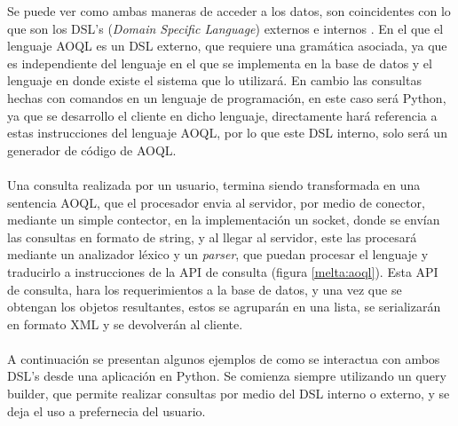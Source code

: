 \documentclass{melta}
\begin{document}
Se puede ver como ambas maneras de acceder a los datos, son coincidentes con lo que son los DSL's (\textit{Domain Specific Language}) externos e internos \cite{dsl:Freeman}\cite{Deursen00domain-specificlanguages:Klint}. En el que el lenguaje AOQL es un DSL externo, que requiere una gramática asociada, ya que es independiente del lenguaje en el que se implementa en la base de datos y el lenguaje en donde existe el sistema que lo utilizará. En cambio las consultas hechas con comandos en un lenguaje de programación, en este caso será Python, ya que se desarrollo el cliente en dicho lenguaje, directamente hará referencia a estas instrucciones del lenguaje AOQL, por lo que este DSL interno, solo será un generador de código de AOQL.
\\\\
Una consulta realizada por un usuario, termina siendo transformada en una sentencia AOQL, que el procesador envia al servidor, por medio de conector, mediante un simple contector, en la implementación un socket, donde se envían las consultas en formato de string, y al llegar al servidor, este las procesará mediante un analizador léxico y un \textit{parser}, que puedan procesar el lenguaje y traducirlo a instrucciones de la API de consulta (figura \ref{melta:aoql}). Esta API de consulta, hara los requerimientos a la base de datos, y una vez que se obtengan los objetos resultantes, estos se agruparán en una lista, se serializarán en formato XML y se devolverán al cliente. 
\\\\
A continuación se presentan algunos ejemplos de como se interactua con ambos DSL's desde una aplicación en Python. Se comienza siempre utilizando un query builder, que permite realizar consultas por medio del DSL interno o externo, y se deja el uso a prefernecia del usuario.
\end{document}
